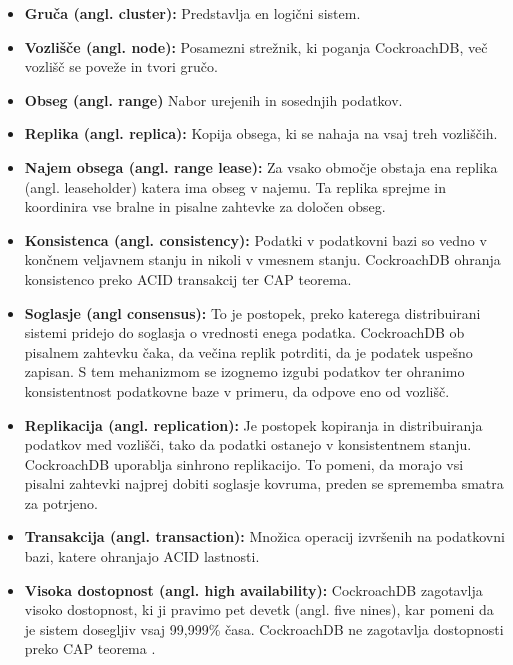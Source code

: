 \documentclass[a4paper, 12pt]{book}
\begin{document}
\begin{itemize}
    \item \textbf{Gruča (angl. cluster):} Predstavlja en logični sistem. 
    \item \textbf{Vozlišče (angl. node):} Posamezni strežnik, ki poganja CockroachDB, več vozlišč se poveže in tvori gručo.
    \item \textbf{Obseg (angl. range)} Nabor urejenih in sosednjih podatkov.
    \item \textbf{Replika (angl. replica):} Kopija obsega, ki se nahaja na vsaj treh vozliščih.
    \item \textbf{Najem obsega (angl. range lease):} Za vsako območje obstaja ena replika (angl. leaseholder) katera ima obseg v najemu. Ta replika sprejme in koordinira vse bralne in pisalne zahtevke za določen obseg.
    \item \textbf{Konsistenca (angl. consistency):} Podatki v podatkovni bazi so vedno v končnem veljavnem stanju in nikoli v vmesnem stanju. CockroachDB ohranja konsistenco preko ACID transakcij ter CAP teorema.
    \item \textbf{Soglasje (angl consensus):} To je postopek, preko katerega distribuirani sistemi pridejo do soglasja o vrednosti enega podatka. CockroachDB ob pisalnem zahtevku čaka, da večina replik potrditi, da je podatek uspešno zapisan. S tem mehanizmom se izognemo izgubi podatkov ter ohranimo konsistentnost podatkovne baze v primeru, da odpove eno od vozlišč.
    \item \textbf{Replikacija (angl. replication):} Je postopek kopiranja in distribuiranja podatkov med vozlišči, tako da podatki ostanejo v konsistentnem stanju. CockroachDB uporablja sinhrono replikacijo. To pomeni, da morajo vsi pisalni zahtevki najprej dobiti soglasje kovruma, preden se sprememba smatra za potrjeno.
    \item \textbf{Transakcija (angl. transaction):} Množica operacij izvršenih na podatkovni bazi, katere ohranjajo ACID lastnosti.
    \item \textbf{Visoka dostopnost (angl. high availability):} CockroachDB zagotavlja visoko dostopnost, ki ji pravimo pet devetk (angl. five nines), kar pomeni da je sistem dosegljiv vsaj 99,999\% časa. CockroachDB ne zagotavlja dostopnosti preko CAP teorema \cite{CRDB-FAQ}.
\end{itemize}
\end{document}
